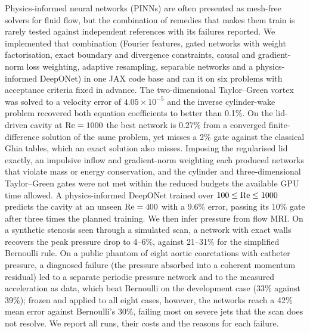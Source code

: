 Physics-informed neural networks (PINNs) are often presented as mesh-free solvers for fluid flow, but the
combination of remedies that makes them train is rarely tested against independent references with its
failures reported. We implemented that combination (Fourier features, gated networks with weight factorisation,
exact boundary and divergence constraints, causal and gradient-norm loss weighting, adaptive resampling,
separable networks and a physics-informed DeepONet) in one JAX code base and ran it on six problems with
acceptance criteria fixed in advance. The two-dimensional Taylor--Green vortex was solved to a velocity error
of $4.05\times10^{-5}$ and the inverse cylinder-wake problem recovered both equation coefficients to better than
0.1\%. On the lid-driven cavity at $\mathrm{Re}=1000$ the best network is 0.27\% from a converged finite-difference
solution of the same problem, yet misses a 2\% gate against the classical Ghia tables, which an exact solution
also misses. Imposing the regularised lid exactly, an impulsive inflow and gradient-norm weighting each produced
networks that violate mass or energy conservation, and the cylinder and three-dimensional Taylor--Green gates
were not met within the reduced budgets the available GPU time allowed. A physics-informed DeepONet trained over
$100\le\mathrm{Re}\le1000$ predicts the cavity at an unseen $\mathrm{Re}=400$ with a 9.6\% error, passing its 10\% gate after three
times the planned training. We then infer pressure from flow MRI. On a synthetic stenosis seen through a simulated
scan, a network with exact walls recovers the peak pressure drop to 4--6\%, against 21--31\% for the simplified
Bernoulli rule. On a public phantom of eight aortic coarctations with catheter pressure, a diagnosed failure (the
pressure absorbed into a coherent momentum residual) led to a separate periodic pressure network and to the measured
acceleration as data, which beat Bernoulli on the development case (33\% against 39\%); frozen and applied to all
eight cases, however, the networks reach a 42\% mean error against Bernoulli's 30\%, failing most on severe jets that
the scan does not resolve. We report all runs, their costs and the reasons for each failure.
